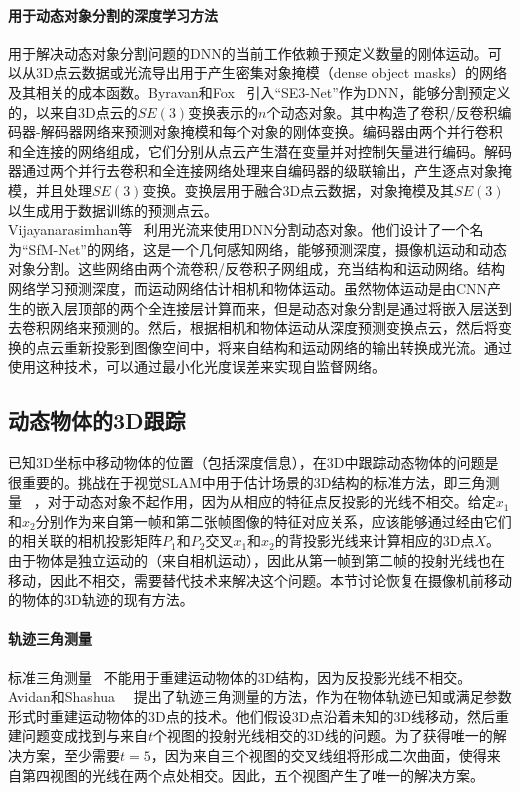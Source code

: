 \paragraph{用于动态对象分割的深度学习方法}
用于解决动态对象分割问题的DNN的当前工作依赖于预定义数量的刚体运动。可以从3D点云数据或光流导出用于产生密集对象掩模（dense object masks）的网络及其相关的成本函数。Byravan和Fox~\cite{byravan2017se3}
引入“SE3-Net”作为DNN，能够分割预定义的，以来自3D点云的$SE(3)$变换表示的$n$个动态对象。其中构造了卷积/反卷积编码器-解码器网络来预测对象掩模和每个对象的刚体变换。编码器由两个并行卷积和全连接的网络组成，它们分别从点云产生潜在变量并对控制矢量进行编码。解码器通过两个并行去卷积和全连接网络处理来自编码器的级联输出，产生逐点对象掩模，并且处理$SE(3)$变换。变换层用于融合3D点云数据，对象掩模及其$SE(3)$以生成用于数据训练的预测点云。\\

Vijayanarasimhan等~\cite{vijayanarasimhan2017sfm}
利用光流来使用DNN分割动态对象。他们设计了一个名为“SfM-Net”的网络，这是一个几何感知网络，能够预测深度，摄像机运动和动态对象分割。这些网络由两个流卷积/反卷积子网组成，充当结构和运动网络。结构网络学习预测深度，而运动网络估计相机和物体运动。虽然物体运动是由CNN产生的嵌入层顶部的两个全连接层计算而来，但是动态对象分割是通过将嵌入层送到去卷积网络来预测的。然后，根据相机和物体运动从深度预测变换点云，然后将变换的点云重新投影到图像空间中，将来自结构和运动网络的输出转换成光流。通过使用这种技术，可以通过最小化光度误差来实现自监督网络。\\



\subsection{动态物体的3D跟踪}
已知3D坐标中移动物体的位置（包括深度信息），在3D中跟踪动态物体的问题是很重要的。挑战在于视觉SLAM中用于估计场景的3D结构的标准方法，即三角测量~\cite{hartley1997triangulation}
，对于动态对象不起作用，因为从相应的特征点反投影的光线不相交。给定$x_1$和$x_2$分别作为来自第一帧和第二张帧图像的特征对应关系，应该能够通过经由它们的相关联的相机投影矩阵$P_1$和$P_2$交叉$x_1$和$x_2$的背投影光线来计算相应的3D点$X$。由于物体是独立运动的（来自相机运动），因此从第一帧到第二帧的投射光线也在移动，因此不相交，需要替代技术来解决这个问题。本节讨论恢复在摄像机前移动的物体的3D轨迹的现有方法。

\paragraph{轨迹三角测量}
标准三角测量~\cite{hartley1997triangulation}
不能用于重建运动物体的3D结构，因为反投影光线不相交。Avidan和Shashua~\cite{avidan1999trajectory}~\cite{avidan2000trajectory}
提出了轨迹三角测量的方法，作为在物体轨迹已知或满足参数形式时重建运动物体的3D点的技术。他们假设3D点沿着未知的3D线移动，然后重建问题变成找到与来自$t$个视图的投射光线相交的3D线的问题。为了获得唯一的解决方案，至少需要$t=5$，因为来自三个视图的交叉线组将形成二次曲面，使得来自第四视图的光线在两个点处相交。因此，五个视图产生了唯一的解决方案。\\

